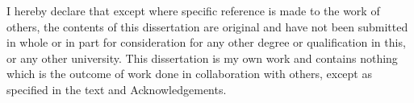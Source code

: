 
\begin{declaration}

I hereby declare that except where specific reference is made to the work of 
others, the contents of this dissertation are original and have not been 
submitted in whole or in part for consideration for any other degree or 
qualification in this, or any other university. This dissertation is my own 
work and contains nothing which is the outcome of work done in collaboration 
with others, except as specified in the text and Acknowledgements. 


\end{declaration}

